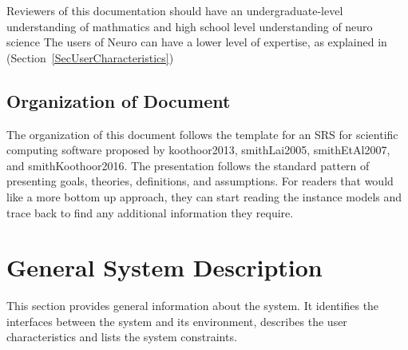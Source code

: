 \documentclass[12pt]{article}
\begin{document}
Reviewers of this documentation should have an undergraduate-level understanding
of mathmatics and high school level understanding of neuro science
 The users of \progname{} Neuro can have a lower level of expertise,
as explained in (Section~\ref{SecUserCharacteristics})
%

\subsection{Organization of Document}

The organization of this document follows the template for an SRS for scientific
computing software proposed by koothoor2013, smithLai2005, smithEtAl2007, and
smithKoothoor2016. The presentation follows the standard pattern of presenting
goals, theories, definitions, and assumptions. For readers that would like a more
bottom up approach, they can start reading the instance models and trace back to
find any additional information they require.

\section{General System Description}


This section provides general information about the system.  It identifies the
interfaces between the system and its environment, describes the user
characteristics and lists the system constraints.
%
\end{document}
